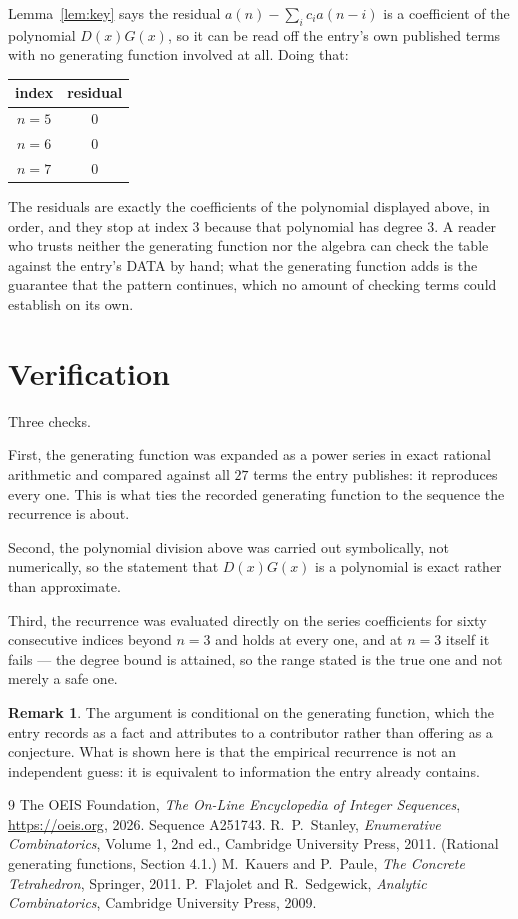 \documentclass[11pt,a4paper]{article}
\theoremstyle{plain}
\theoremstyle{definition}
\newtheorem{remark}[theorem]{Remark}
\begin{document}
Lemma~\ref{lem:key} says the residual $a(n)-\sum_ic_ia(n-i)$ is a coefficient of the
polynomial $D(x)G(x)$, so it can be read off the entry's own published terms with no
generating function involved at all. Doing that:
\begin{center}
\begin{tabular}{cc}
index & residual \\ \hline
$n=5$ & $0$ \\
$n=6$ & $0$ \\
$n=7$ & $0$
\end{tabular}
\end{center}
The residuals are exactly the coefficients of the polynomial displayed above, in order, and
they stop at index $3$ because that polynomial has degree $3$. A reader who trusts
neither the generating function nor the algebra can check the table against the entry's DATA
by hand; what the generating function adds is the guarantee that the pattern continues, which
no amount of checking terms could establish on its own.

\section{Verification}

Three checks.

First, the generating function was expanded as a power series in exact rational arithmetic and
compared against all $27$ terms the entry publishes: it reproduces every one. This is
what ties the recorded generating function to the sequence the recurrence is about.

Second, the polynomial division above was carried out symbolically, not numerically, so the
statement that $D(x)G(x)$ is a polynomial is exact rather than approximate.

Third, the recurrence was evaluated directly on the series coefficients for sixty consecutive
indices beyond $n=3$ and holds at every one, and at $n=3$ itself it fails --- the
degree bound is attained, so the range stated is the true one and not merely a safe one.

\begin{remark}
The argument is conditional on the generating function, which the entry records as a fact and
attributes to a contributor rather than offering as a conjecture. What is shown here is that
the empirical recurrence is not an independent guess: it is equivalent to information the
entry already contains.
\end{remark}

\begin{thebibliography}{9}
 The OEIS Foundation, \emph{The On-Line Encyclopedia of Integer
Sequences}, \url{https://oeis.org}, 2026. Sequence A251743.
 R.~P.~Stanley, \emph{Enumerative Combinatorics}, Volume 1, 2nd ed.,
Cambridge University Press, 2011. (Rational generating functions, Section 4.1.)
 M.~Kauers and P.~Paule, \emph{The Concrete Tetrahedron}, Springer, 2011.
 P.~Flajolet and R.~Sedgewick, \emph{Analytic Combinatorics}, Cambridge
University Press, 2009.
\end{thebibliography}
\end{document}
